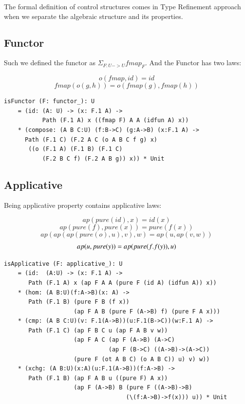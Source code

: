 \documentclass{article}
\begin{document}
The formal definition of control structures comes in Type Refinement approach when
we separate the algebraic structure and its properties.

\subsection*{Functor}

Such we defined the functor as $\Sigma_{F:U->U} fmap_F$. And the Functor has two laws:

\begin{equation} o(fmap,id) = id \end{equation}
\begin{equation} fmap(o(g,h)) = o(fmap(g),fmap(h)) \end{equation}

\begin{lstlisting}[mathescape=true]
isFunctor (F: functor_): U
    = (id: (A: U) -> (x: F.1 A) ->
           Path (F.1 A) x ((fmap F) A A (idfun A) x))
    * (compose: (A B C:U) (f:B->C) (g:A->B) (x:F.1 A) ->
      Path (F.1 C) (F.2 A C (o A B C f g) x)
       ((o (F.1 A) (F.1 B) (F.1 C)
           (F.2 B C f) (F.2 A B g)) x)) * Unit
\end{lstlisting}

\newpage
\subsection*{Applicative}

Being applicative property contains applicative laws:

\begin{equation} ap(pure(id),x) = id(x) \end{equation}
\begin{equation} ap(pure(f),pure(x)) = pure(f(x)) \end{equation}
\begin{equation} ap(ap(ap(pure(o),u),v),w) = ap(u,ap(v,w)) \end{equation}
\begin{equation} ap(u,pure(y)) = ap(pure(\\f.f(y)),u) \end{equation}

\begin{lstlisting}[mathescape=true]
isApplicative (F: applicative_): U
    = (id:  (A:U) -> (x: F.1 A) ->
       Path (F.1 A) x (ap F A A (pure F (id A) (idfun A)) x))
    * (hom: (A B:U)(f:A->B)(x: A) ->
       Path (F.1 B) (pure F B (f x))
                    (ap F A B (pure F (A->B) f) (pure F A x)))
    * (cmp: (A B C:U)(v: F.1(A->B))(u:F.1(B->C))(w:F.1 A) ->
       Path (F.1 C) (ap F B C u (ap F A B v w))
                    (ap F A C (ap F (A->B) (A->C)
                              (ap F (B->C) ((A->B)->(A->C))
                    (pure F (ot A B C) (o A B C)) u) v) w))
    * (xchg: (A B:U)(x:A)(u:F.1(A->B))(f:A->B) ->
       Path (F.1 B) (ap F A B u ((pure F) A x))
                    (ap F (A->B) B (pure F ((A->B)->B)
                                   (\(f:A->B)->f(x))) u)) * Unit
\end{lstlisting}
\end{document}
